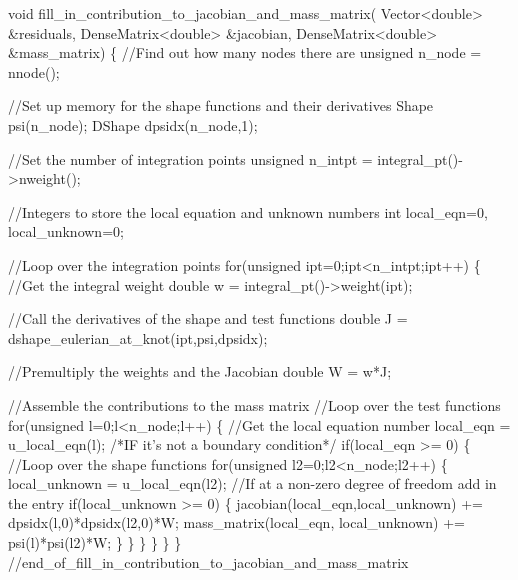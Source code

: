 \begin{DoxyCodeInclude}
 \textcolor{keywordtype}{void} fill\_in\_contribution\_to\_jacobian\_and\_mass\_matrix(
  Vector<double> &residuals,
  DenseMatrix<double> &jacobian, DenseMatrix<double> &mass\_matrix)
  \{
   \textcolor{comment}{//Find out how many nodes there are}
   \textcolor{keywordtype}{unsigned} n\_node = nnode();
   
   \textcolor{comment}{//Set up memory for the shape functions and their derivatives}
   Shape psi(n\_node);
   DShape dpsidx(n\_node,1);

   \textcolor{comment}{//Set the number of integration points}
   \textcolor{keywordtype}{unsigned} n\_intpt = integral\_pt()->nweight();
   
   \textcolor{comment}{//Integers to store the local equation and unknown numbers}
   \textcolor{keywordtype}{int} local\_eqn=0, local\_unknown=0;
   
   \textcolor{comment}{//Loop over the integration points}
   \textcolor{keywordflow}{for}(\textcolor{keywordtype}{unsigned} ipt=0;ipt<n\_intpt;ipt++)
    \{
     \textcolor{comment}{//Get the integral weight}
     \textcolor{keywordtype}{double} w = integral\_pt()->weight(ipt);
     
     \textcolor{comment}{//Call the derivatives of the shape and test functions}
     \textcolor{keywordtype}{double} J = dshape\_eulerian\_at\_knot(ipt,psi,dpsidx);
     
     \textcolor{comment}{//Premultiply the weights and the Jacobian}
     \textcolor{keywordtype}{double} W = w*J;

     \textcolor{comment}{//Assemble the contributions to the mass matrix}
     \textcolor{comment}{//Loop over the test functions}
     \textcolor{keywordflow}{for}(\textcolor{keywordtype}{unsigned} l=0;l<n\_node;l++)
      \{
       \textcolor{comment}{//Get the local equation number}
       local\_eqn = u\_local\_eqn(l);
       \textcolor{comment}{/*IF it's not a boundary condition*/}
       \textcolor{keywordflow}{if}(local\_eqn >= 0)
        \{
         \textcolor{comment}{//Loop over the shape functions}
         \textcolor{keywordflow}{for}(\textcolor{keywordtype}{unsigned} l2=0;l2<n\_node;l2++)
          \{ 
           local\_unknown = u\_local\_eqn(l2);
           \textcolor{comment}{//If at a non-zero degree of freedom add in the entry}
           \textcolor{keywordflow}{if}(local\_unknown >= 0)
            \{
             jacobian(local\_eqn,local\_unknown) += dpsidx(l,0)*dpsidx(l2,0)*W;
             mass\_matrix(local\_eqn, local\_unknown) += psi(l)*psi(l2)*W;
            \}
          \}
        \}
      \}
    \}
  \} \textcolor{comment}{//end\_of\_fill\_in\_contribution\_to\_jacobian\_and\_mass\_matrix}

\end{DoxyCodeInclude}


